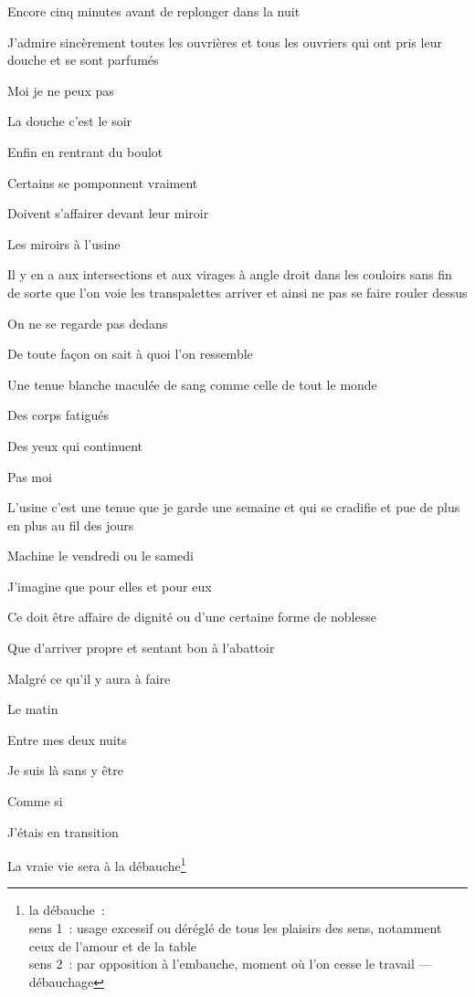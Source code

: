 {Encore cinq minutes avant de replonger dans la nuit

J'admire sincèrement toutes les ouvrières et tous les ouvriers qui ont pris 
leur douche et se sont parfumés

Moi je ne peux pas

La douche c'est le soir

Enfin en rentrant du boulot

Certains se pomponnent vraiment

Doivent s'affairer devant leur miroir

\medskip

Les miroirs à l'usine

Il y en a aux intersections et aux virages à angle droit dans les couloirs 
sans fin de sorte que l'on voie les transpalettes arriver et ainsi ne pas se 
faire rouler dessus

On ne se regarde pas dedans

De toute façon on sait à quoi l'on ressemble

Une tenue blanche maculée de sang comme celle de tout le monde

Des corps fatigués

Des yeux qui continuent

\medskip

Pas moi

L'usine c'est une tenue que je garde une semaine et qui se cradifie et pue de plus en plus au fil des jours

Machine le vendredi ou le samedi

\medskip

J'imagine que pour elles et pour eux

Ce doit être affaire de dignité ou d'une certaine forme de noblesse

Que d'arriver propre et sentant bon à l'abattoir

Malgré ce qu'il y aura à faire

\medskip

Le matin

Entre mes deux nuits

Je suis là sans y être

Comme si

J'étais en transition

La vraie vie sera à la débauche\footnote{la débauche~:\\sens 1~: usage excessif ou déréglé de tous les plaisirs des sens, notamment ceux de l'amour et de la table\\sens 2~: par opposition à l'embauche, moment où l'on cesse le travail --- débauchage}
\setlength{\parskip}{6pt}
}

